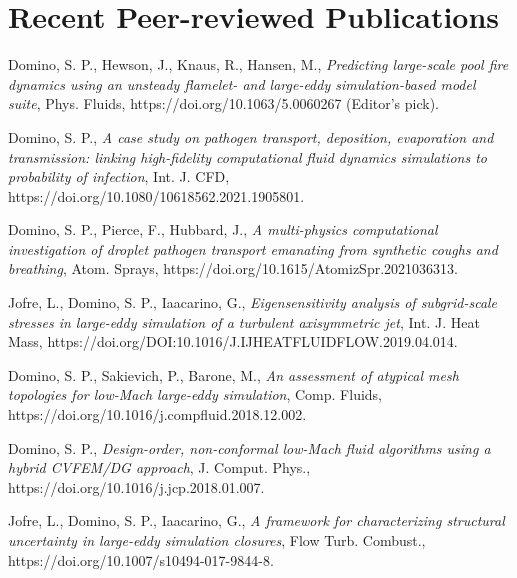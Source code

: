 \documentclass[letterpaper]{twentysecondcv_spd} %
\begin{document}
\section{Recent Peer-reviewed Publications}

\begin{twentyshort} %

 {Domino, S. P., Hewson, J., Knaus, R., Hansen, M., \textit{Predicting large-scale pool fire dynamics using an unsteady flamelet- and large-eddy simulation-based model suite}, Phys. Fluids, https://doi.org/10.1063/5.0060267 (Editor's pick).}

 {Domino, S. P.,  \textit{A case study on pathogen transport, deposition, evaporation and transmission: linking high-fidelity computational fluid dynamics simulations to probability of infection}, Int. J. CFD, https://doi.org/10.1080/10618562.2021.1905801.}

 {Domino, S. P., Pierce, F., Hubbard, J.,  \textit{A multi-physics computational investigation of droplet pathogen transport emanating from synthetic coughs and breathing}, Atom. Sprays, https://doi.org/10.1615/AtomizSpr.2021036313.}

 {Jofre, L., Domino, S. P., Iaacarino, G.,  \textit{Eigensensitivity analysis of subgrid-scale stresses in large-eddy simulation of a turbulent axisymmetric jet}, Int. J. Heat Mass, https://doi.org/DOI:10.1016/J.IJHEATFLUIDFLOW.2019.04.014.}

 {Domino, S. P., Sakievich, P., Barone, M.,  \textit{An assessment of atypical mesh topologies for low-Mach large-eddy simulation}, Comp. Fluids, https://doi.org/10.1016/j.compfluid.2018.12.002.}

 {Domino, S. P.,  \textit{Design-order, non-conformal low-Mach fluid algorithms using a hybrid CVFEM/DG approach}, J. Comput. Phys., https://doi.org/10.1016/j.jcp.2018.01.007.}

 {Jofre, L., Domino, S. P., Iaacarino, G.,  \textit{A framework for characterizing structural uncertainty in large-eddy simulation closures}, Flow Turb. Combust., https://doi.org/10.1007/s10494-017-9844-8.}

\end{twentyshort} 

\end{document}
